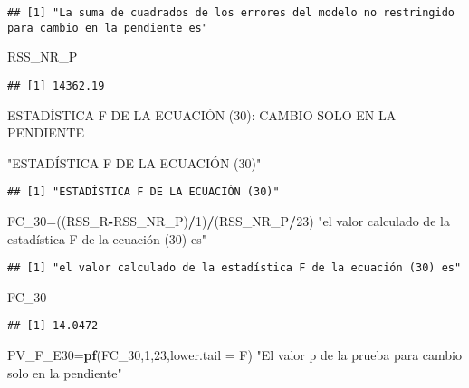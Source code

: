 \documentclass[
]{article}
\newenvironment{Shaded}{\begin{snugshade}}{\end{snugshade}}
\newcommand{\DataTypeTok}[1]{\textcolor[rgb]{0.13,0.29,0.53}{#1}}
\newcommand{\DecValTok}[1]{\textcolor[rgb]{0.00,0.00,0.81}{#1}}
\newcommand{\KeywordTok}[1]{\textcolor[rgb]{0.13,0.29,0.53}{\textbf{#1}}}
\newcommand{\NormalTok}[1]{#1}
\newcommand{\OperatorTok}[1]{\textcolor[rgb]{0.81,0.36,0.00}{\textbf{#1}}}
\newcommand{\StringTok}[1]{\textcolor[rgb]{0.31,0.60,0.02}{#1}}
\begin{document}
\begin{verbatim}
## [1] "La suma de cuadrados de los errores del modelo no restringido para cambio en la pendiente es"
\end{verbatim}

\begin{Shaded}
\begin{Highlighting}[]
\NormalTok{RSS_NR_P}
\end{Highlighting}
\end{Shaded}

\begin{verbatim}
## [1] 14362.19
\end{verbatim}

ESTADÍSTICA F DE LA ECUACIÓN (30): CAMBIO SOLO EN LA PENDIENTE

\begin{Shaded}
\begin{Highlighting}[]
\StringTok{"ESTADÍSTICA F DE LA ECUACIÓN (30)"}
\end{Highlighting}
\end{Shaded}

\begin{verbatim}
## [1] "ESTADÍSTICA F DE LA ECUACIÓN (30)"
\end{verbatim}

\begin{Shaded}
\begin{Highlighting}[]
\NormalTok{FC_}\DecValTok{30}\NormalTok{=((RSS_R}\OperatorTok{-}\NormalTok{RSS_NR_P)}\OperatorTok{/}\DecValTok{1}\NormalTok{)}\OperatorTok{/}\NormalTok{(RSS_NR_P}\OperatorTok{/}\DecValTok{23}\NormalTok{)}
\StringTok{"el valor calculado de la estadística F de la ecuación (30) es"}
\end{Highlighting}
\end{Shaded}

\begin{verbatim}
## [1] "el valor calculado de la estadística F de la ecuación (30) es"
\end{verbatim}

\begin{Shaded}
\begin{Highlighting}[]
\NormalTok{FC_}\DecValTok{30}
\end{Highlighting}
\end{Shaded}

\begin{verbatim}
## [1] 14.0472
\end{verbatim}

\begin{Shaded}
\begin{Highlighting}[]
\NormalTok{PV_F_E30=}\KeywordTok{pf}\NormalTok{(FC_}\DecValTok{30}\NormalTok{,}\DecValTok{1}\NormalTok{,}\DecValTok{23}\NormalTok{,}\DataTypeTok{lower.tail =}\NormalTok{ F)}
\StringTok{"El valor p de la prueba para cambio solo en la pendiente"}
\end{Highlighting}
\end{Shaded}
\end{document}
